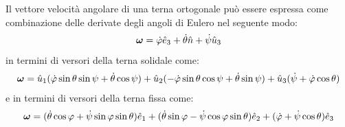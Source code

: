     \begin{theorem}
    \label{th: omega in eulero}
        Il vettore velocità angolare di una terna ortogonale può essere espressa come combinazione delle derivate degli angoli di Eulero nel seguente modo:
        \begin{equation}
            \boldsymbol{\omega} = \dot{\varphi}\hat{e}_3+\dot{\theta}\hat{n}+\dot{\psi}\hat{u}_3
            \label{omega in eulero}
        \end{equation}
        in termini di versori della terna solidale come:
        \begin{equation}
            \boldsymbol{\omega} = \hat{u}_1(\dot{\varphi}\sin\theta\sin\psi +\dot{\theta}\cos\psi)+\hat{u}_2(-\dot{\varphi}\sin\theta\cos\psi+\dot{\theta}\sin\psi)+\hat{u}_3(\dot{\psi}+\dot{\varphi}\cos\theta)
        \end{equation}
        e in termini di versori della terna fissa come:
        \begin{equation}
            \boldsymbol{\omega} = (\dot{\theta}\cos\varphi+\dot{\psi}\sin\varphi\sin\theta)\hat{e}_1+(\dot{\theta}\sin\varphi -\dot{\psi}\cos \varphi \sin \theta)\hat{e}_2+(\dot{\varphi}+\dot{\psi}\cos\theta)\hat{e}_3
        \end{equation}
    \end{theorem}

